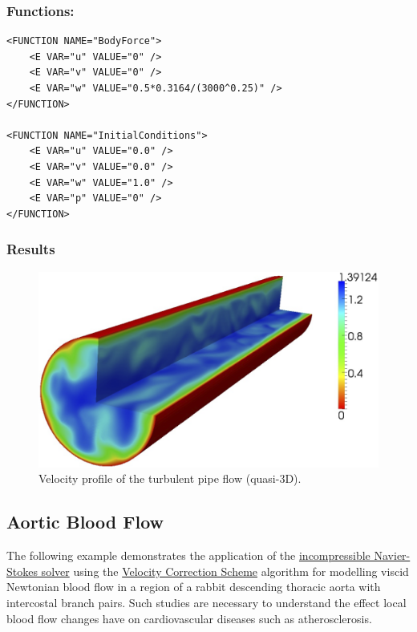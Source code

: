 \subsubsection{Functions:~} 
\begin{lstlisting}[style=XMLStyle]
<FUNCTION NAME="BodyForce">
	<E VAR="u" VALUE="0" />
	<E VAR="v" VALUE="0" />
	<E VAR="w" VALUE="0.5*0.3164/(3000^0.25)" />
</FUNCTION>

<FUNCTION NAME="InitialConditions">
	<E VAR="u" VALUE="0.0" />
	<E VAR="v" VALUE="0.0" />
	<E VAR="w" VALUE="1.0" />
	<E VAR="p" VALUE="0" />
</FUNCTION>
\end{lstlisting}

\subsubsection{Results}

\begin{figure}
\begin{center}
\includegraphics[width=12cm]{Figures/PipeCont.png}
\caption{Velocity profile of the turbulent pipe flow (quasi-3D).}
\end{center}
\end{figure}

\subsection{Aortic Blood Flow}
The following example demonstrates the application of the \hyperref[IncNSsolver]{incompressible Navier-Stokes solver} using the \hyperref[VCSscheme]{Velocity Correction Scheme} algorithm for modelling viscid Newtonian blood flow in a region of a rabbit descending thoracic aorta with intercostal branch pairs. Such studies are necessary to understand the effect local blood flow changes have on cardiovascular diseases such as atherosclerosis. 

